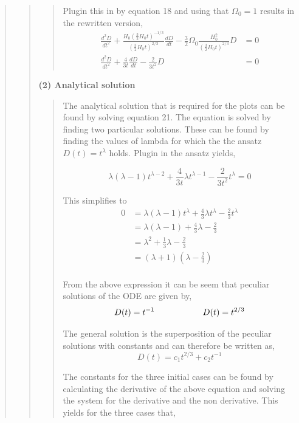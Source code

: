 \begin{quote}
\begin{quote}
\begin{quote}
Plugin this in by equation 18 and using that $\Omega_0 = 1$  results in the rewritten version,
\begin{align}
\frac{d^2D}{dt^2} + \frac{H_0 \left(\frac{3}{2} H_0 t \right)^{-1/3}}{\left(\frac{3}{2} H_0 t \right)^{2/3}} \frac{dD}{dt} - \frac{3}{2} \Omega_0 \frac{H_0^2}{\left(\frac{3}{2} H_0 t \right)^{2/3}}D &= 0 \\
\frac{d^2D}{dt^2} + \frac{4}{3t} \frac{dD}{dt} - \frac{2}{3t^2}D &= 0
\label{eq:ode2}
\end{align}
\end{quote}


\textbf{(2) Analytical solution}
\begin{quote}
The analytical solution that is required for the plots can be found by solving equation 21. The equation is solved by finding two particular solutions. These can be found by finding the values of lambda for which the the ansatz $D(t) = t^{\lambda}$ holds. Plugin in the ansatz yields,

\begin{equation}
\lambda \left(\lambda -1 \right) t^{\lambda - 2} + \frac{4}{3t} \lambda t^{\lambda -1} - \frac{2}{3t^2}t^{\lambda} = 0
\end{equation}

This simplifies to
\begin{align*}
0 & = \lambda \left( \lambda -1 \right) t^{\lambda} + \frac{4}{3} \lambda t^{\lambda} - \frac{2}{3} t^{\lambda}  \\
&= \lambda ( \lambda -1 ) + \frac{4}{3} \lambda - \frac{2}{3}  \\
&= \lambda^2 + \frac{1}{3} \lambda - \frac{2}{3} \\
&= (\lambda + 1) (\lambda - \frac{2}{3} )  \\
\end{align*}

From the above expression it can be seem that peculiar solutions of the ODE are given by,
\begin{equation}
D(t) = t^{-1} \hspace*{2cm} D(t) = t^{2/3}
\end{equation}

The general solution is the superposition of the peculiar solutions with constants and can therefore be written as,
\begin{equation}
D(t) = c_{1} t^{2/3} + c_2 t^{-1}
\end{equation}

The constants for the three initial cases can be found by calculating the derivative of the above equation and solving the system for the derivative and the non derivative.  This yields for the three cases that, 


\end{quote}
\end{quote}
\end{quote}
